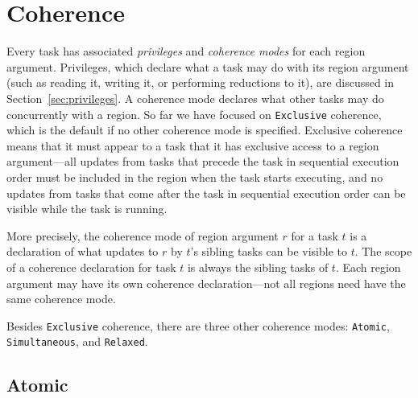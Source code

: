\chapter{Coherence}
\label{chap:coherence}

Every task has associated {\em privileges} and {\em coherence modes} for each region argument.  Privileges, which
declare what a task may do with its region argument (such as reading it, writing it, or performing reductions to it), are discussed in Section~\ref{sec:privileges}.  A coherence mode declares what other tasks may do concurrently
with a region.  So far we have focused on {\tt Exclusive} coherence, which is the default if no other coherence mode is specified.  Exclusive coherence means that it must
appear to a task that it has exclusive access to a region argument---all updates from tasks that precede the task in sequential execution order must be included in the region
when the task starts executing, and no updates from tasks that come after the task in sequential execution order can be visible while the task is running.

More precisely, the coherence mode of region argument $r$ for a task $t$ is a declaration of what updates to $r$ by $t$'s sibling tasks can be visible to $t$.  The scope of a coherence declaration for task $t$ is always the sibling tasks of $t$.  Each region argument may have its own coherence declaration---not all regions
need have the same coherence mode.

Besides {\tt Exclusive} coherence, there are three other coherence modes: {\tt Atomic}, {\tt Simultaneous}, and {\tt Relaxed}.

\section{Atomic}
\label{sec:atomic}

\begin{figure}
  
  \caption{}
  \label{fig:atomic}
\end{figure}

